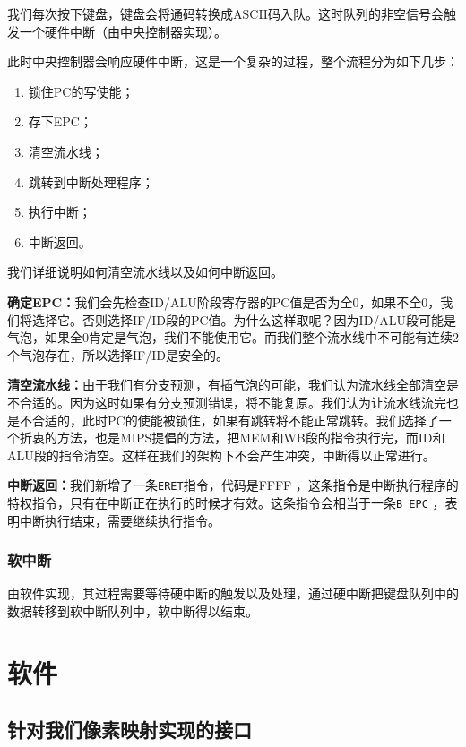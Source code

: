 我们每次按下键盘，键盘会将通码转换成ASCII码入队。这时队列的非空信号会触发一个硬件中断（由中央控制器实现）。

此时中央控制器会响应硬件中断，这是一个复杂的过程，整个流程分为如下几步：

\begin{enumerate}
    \item 锁住PC的写使能；
    \item 存下EPC；
    \item 清空流水线；
    \item 跳转到中断处理程序；
    \item 执行中断；
    \item 中断返回。
\end{enumerate}

我们详细说明如何清空流水线以及如何中断返回。

\textbf{确定EPC：}我们会先检查ID/ALU阶段寄存器的PC值是否为全0，如果不全0，我们将选择它。否则选择IF/ID段的PC值。为什么这样取呢？因为ID/ALU段可能是气泡，如果全0肯定是气泡，我们不能使用它。而我们整个流水线中不可能有连续2个气泡存在，所以选择IF/ID是安全的。

\textbf{清空流水线：}由于我们有分支预测，有插气泡的可能，我们认为流水线全部清空是不合适的。因为这时如果有分支预测错误，将不能复原。我们认为让流水线流完也是不合适的，此时PC的使能被锁住，如果有跳转将不能正常跳转。我们选择了一个折衷的方法，也是MIPS提倡的方法，把MEM和WB段的指令执行完，而ID和ALU段的指令清空。这样在我们的架构下不会产生冲突，中断得以正常进行。

\textbf{中断返回：}我们新增了一条\texttt{ERET}指令，代码是FFFF ，这条指令是中断执行程序的特权指令，只有在中断正在执行的时候才有效。这条指令会相当于一条\texttt{B EPC} ，表明中断执行结束，需要继续执行指令。

\subsubsection{软中断}
由软件实现，其过程需要等待硬中断的触发以及处理，通过硬中断把键盘队列中的数据转移到软中断队列中，软中断得以结束。

\section{软件}

\subsection{针对我们像素映射实现的接口}

